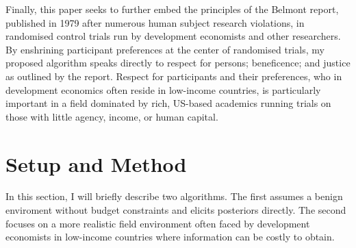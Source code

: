 \documentclass[twoside,11pt]{article}
\begin{document}

Finally, this paper seeks to further embed the principles of the Belmont report, 
published in 1979 after numerous human subject research violations, in randomised 
control trials run by development economists and other researchers. By enshrining 
participant preferences at the center of randomised trials, my proposed algorithm 
speaks directly to respect for persons; beneficence; and justice as outlined by 
the report. Respect for participants and their preferences, who in development 
economics often reside in low-income countries, is particularly important in 
a field dominated by rich, US-based academics \citep{stansbury} running trials on those with 
little agency, income, or human capital.

\section{Setup and Method}

In this section, I will briefly describe two algorithms. The first assumes a benign 
enviroment without budget constraints and elicits posteriors directly. The second focuses on a more 
realistic field environment often faced by development economists in low-income
countries where information can be costly to obtain.
\end{document}
